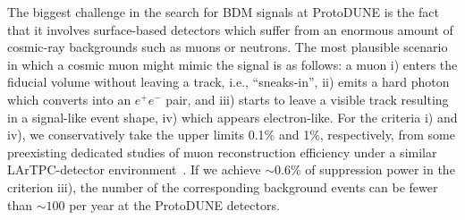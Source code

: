 The biggest challenge in the search for BDM signals at ProtoDUNE is the fact that it involves surface-based detectors which suffer from an enormous amount of cosmic-ray backgrounds such as muons or neutrons.
The most plausible scenario in which a cosmic muon might mimic the signal is as follows: a muon i) enters the fiducial volume without leaving a track, i.e., ``sneaks-in'', ii) emits a hard photon which converts into an $e^+ e^-$ pair, and iii) starts to leave a visible track resulting in a signal-like event shape, iv) which appears electron-like.
For the criteria i) and iv), we conservatively take the upper limits 0.1\% and 1\%, respectively, from some preexisting dedicated studies of muon reconstruction efficiency under a similar LArTPC-detector environment~\cite{MicroBooNEmuon, Acciarri:2016sli}.
If we achieve $\sim 0.6\%$ of suppression power in the criterion iii), the number of the corresponding background events can be fewer than $\sim 100$ per year at the ProtoDUNE detectors.

